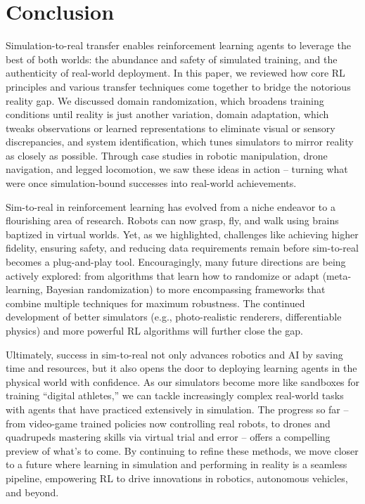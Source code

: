 \section{Conclusion}
Simulation-to-real transfer enables reinforcement learning agents to leverage the best of both worlds: the abundance and safety of simulated training, and the authenticity of real-world deployment. In this paper, we reviewed how core RL principles and various transfer techniques come together to bridge the notorious reality gap. We discussed domain randomization, which broadens training conditions until reality is just another variation, domain adaptation, which tweaks observations or learned representations to eliminate visual or sensory discrepancies, and system identification, which tunes simulators to mirror reality as closely as possible. Through case studies in robotic manipulation, drone navigation, and legged locomotion, we saw these ideas in action – turning what were once simulation-bound successes into real-world achievements.

Sim-to-real in reinforcement learning has evolved from a niche endeavor to a flourishing area of research. Robots can now grasp, fly, and walk using brains baptized in virtual worlds. Yet, as we highlighted, challenges like achieving higher fidelity, ensuring safety, and reducing data requirements remain before sim-to-real becomes a plug-and-play tool. Encouragingly, many future directions are being actively explored: from algorithms that learn how to randomize or adapt (meta-learning, Bayesian randomization) to more encompassing frameworks that combine multiple techniques for maximum robustness. The continued development of better simulators (e.g., photo-realistic renderers, differentiable physics) and more powerful RL algorithms will further close the gap.

Ultimately, success in sim-to-real not only advances robotics and AI by saving time and resources, but it also opens the door to deploying learning agents in the physical world with confidence. As our simulators become more like sandboxes for training “digital athletes,” we can tackle increasingly complex real-world tasks with agents that have practiced extensively in simulation. The progress so far – from video-game trained policies now controlling real robots, to drones and quadrupeds mastering skills via virtual trial and error – offers a compelling preview of what’s to come. By continuing to refine these methods, we move closer to a future where learning in simulation and performing in reality is a seamless pipeline, empowering RL to drive innovations in robotics, autonomous vehicles, and beyond.